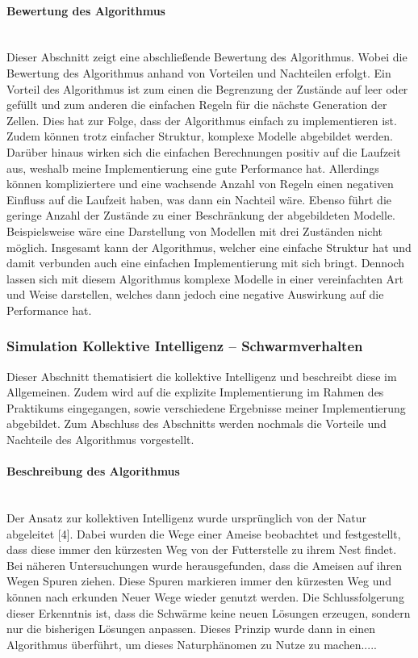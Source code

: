 \documentclass[../mciAusarbeitung.tex]{subfiles}
\begin{document}
            
            \paragraph{Bewertung des Algorithmus}$~$ \\
            Dieser Abschnitt zeigt eine abschließende Bewertung des Algorithmus. Wobei die Bewertung des Algorithmus anhand von Vorteilen und Nachteilen erfolgt. 
            Ein Vorteil des Algorithmus ist zum einen die Begrenzung der Zustände auf leer oder gefüllt und zum anderen die einfachen Regeln für die nächste Generation der Zellen. Dies hat zur Folge, dass der Algorithmus einfach zu implementieren ist. Zudem können trotz einfacher Struktur, komplexe Modelle abgebildet werden. Darüber hinaus wirken sich die einfachen Berechnungen positiv auf die Laufzeit aus, weshalb meine Implementierung eine gute Performance hat.
            Allerdings können kompliziertere und eine wachsende Anzahl von Regeln einen negativen Einfluss auf die Laufzeit haben, was dann ein Nachteil wäre. Ebenso führt die geringe Anzahl der Zustände zu einer Beschränkung der abgebildeten Modelle. Beispielsweise wäre eine Darstellung von Modellen mit drei Zuständen nicht möglich.
            Insgesamt kann der Algorithmus, welcher eine einfache Struktur hat und damit verbunden auch eine einfachen Implementierung mit sich bringt. Dennoch lassen sich mit diesem Algorithmus komplexe Modelle in einer vereinfachten Art und Weise darstellen, welches dann jedoch eine negative Auswirkung auf die Performance hat. 
        
        \subsubsection{Simulation Kollektive Intelligenz – Schwarmverhalten}
        Dieser Abschnitt thematisiert die kollektive Intelligenz und beschreibt diese im Allgemeinen. Zudem wird auf die explizite Implementierung im Rahmen des Praktikums eingegangen, sowie verschiedene Ergebnisse meiner Implementierung abgebildet. Zum Abschluss des Abschnitts werden nochmals die Vorteile und Nachteile des Algorithmus vorgestellt.
        
            \paragraph{Beschreibung des Algorithmus}$~$ \\
            Der Ansatz zur kollektiven Intelligenz wurde ursprünglich von der Natur abgeleitet [4]. Dabei wurden die Wege einer Ameise beobachtet und festgestellt, dass diese immer den kürzesten Weg von der Futterstelle zu ihrem Nest findet. Bei näheren Untersuchungen wurde herausgefunden, dass die Ameisen auf ihren Wegen Spuren ziehen. Diese Spuren markieren immer den kürzesten Weg und können nach erkunden Neuer Wege wieder genutzt werden. Die Schlussfolgerung dieser Erkenntnis ist, dass die Schwärme keine neuen Lösungen erzeugen, sondern nur die bisherigen Lösungen anpassen. Dieses Prinzip wurde dann in einen Algorithmus überführt, um dieses Naturphänomen zu Nutze zu machen.....
            
\end{document}
